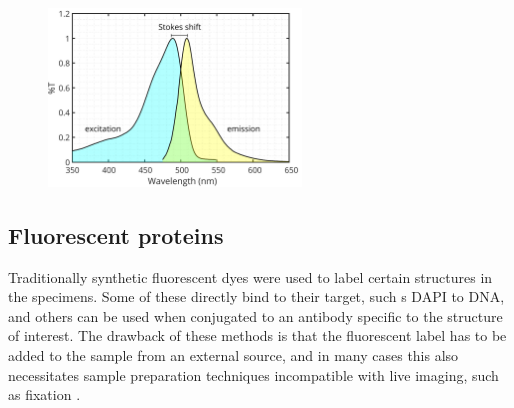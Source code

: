   \begin{figure}
    \centering
    \includegraphics[width=0.6\textwidth]{spectrum/egfp}
    \label{fig:spectrum}
  \end{figure}



  \subsection{Fluorescent proteins}
    Traditionally synthetic fluorescent dyes were used to label certain structures in the specimens. Some of these directly bind to their target, such s DAPI to DNA, and others can be used when conjugated to an antibody specific to the structure of interest. The drawback of these methods is that the fluorescent label has to be added to the sample from an external source, and in many cases this also necessitates sample preparation techniques incompatible with live imaging, such as fixation \cite{!!!}.

